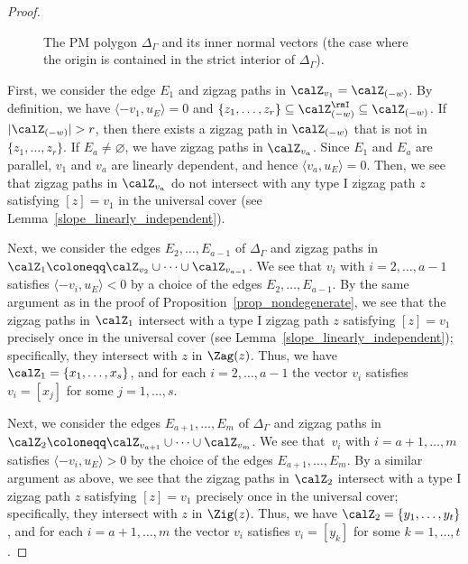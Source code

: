 \begin{proof}
\begin{figure}[h!]
{
}
\caption{The PM polygon $\Delta_\Gamma$ and its inner normal vectors (the case where the origin is contained in the strict interior of $\Delta_\Gamma$).}
\label{PMpolygon_normalvec}
\end{figure}

First, we consider the edge $E_1$ and zigzag paths in $\calZ_{v_1}=\calZ_{(-w)}$.
By definition, we have $\langle -v_1,u_E\rangle=0$ and $\{z_1,\dots,z_r\}\subseteq\calZ_{(-w)}^\rmI\subseteq \calZ_{(-w)}$.
If $|\calZ_{(-w)}|>r$, then there exists a zigzag path in $\calZ_{(-w)}$ that is not in $\{z_1,\dots,z_r\}$.
If $E_a\neq\varnothing$, we have zigzag paths in $\calZ_{v_a}$.
Since $E_1$ and $E_a$ are parallel, $v_1$ and $v_a$ are linearly dependent, and hence $\langle v_a,u_E\rangle=0$.
Then, we see that zigzag paths in $\calZ_{v_a}$ do not intersect with any type I zigzag path $z$ satisfying $[z]=v_1$ in the universal cover (see Lemma~\ref{slope_linearly_independent}).

Next, we consider the edges $E_2,\dots,E_{a-1}$ of $\Delta_\Gamma$ and zigzag paths in $\calZ_1\coloneqq\calZ_{v_2}\cup\cdots\cup\calZ_{v_{a-1}}$.
We see that $v_i$ with $i=2,\dots,a-1$ satisfies $\langle -v_i,u_E\rangle<0$ by a choice of the edges $E_2,\dots,E_{a-1}$.
By the same argument as in the proof of Proposition~\ref{prop_nondegenerate}, we see that
the zigzag paths in $\calZ_1$ intersect with a type I zigzag path $z$ satisfying $[z]=v_1$ precisely once in the universal cover (see Lemma~\ref{slope_linearly_independent}); specifically, they intersect with $z$ in $\Zag(z)$.
Thus, we have $\calZ_1=\{x_1,\dots,x_s\}$, and for each $i=2,\dots ,a-1$ the vector $v_i$ satisfies $v_i=[x_j]$ for some $j=1,\dots,s$.

Next, we consider the edges $E_{a+1},\dots,E_m$ of $\Delta_\Gamma$ and zigzag paths in $\calZ_2\coloneqq\calZ_{v_{a+1}}\cup\cdots\allowbreak\cup\calZ_{v_m}$.
We see that~$v_i$ with $i=a+1,\dots,m$ satisfies $\langle -v_i,u_E\rangle>0$ by the choice of the edges $E_{a+1},\dots,E_m$.
By a similar argument as above, we see that the zigzag paths in $\calZ_2$ intersect with a type I zigzag path $z$ satisfying $[z]=v_1$ precisely once in the universal cover; specifically, they intersect with $z$ in $\Zig(z)$.
Thus, we have $\calZ_2=\{y_1,\dots,y_t\}$, and for each $i=a+1,\dots,m$ the vector $v_i$ satisfies $v_i=[y_k]$ for some $k=1,\dots,t$.


\end{proof}

